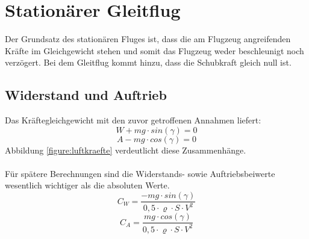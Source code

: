 \section{Stationärer Gleitflug}
Der Grundsatz des stationären Fluges ist, dass die am Flugzeug angreifenden Kräfte im Gleichgewicht stehen und somit das Flugzeug weder beschleunigt noch verzögert. Bei dem Gleitflug kommt hinzu, dass die Schubkraft gleich null ist.
\subsection{Widerstand und Auftrieb}
Das Kräftegleichgewicht mit den zuvor getroffenen Annahmen liefert:
\begin{equation}
\label{eq:kräftegleichgewichtWiderstand}
W + mg \cdot sin(\gamma) = 0
\end{equation}
%
%
%
\begin{equation}
\label{eq:kräftegleichgewichtAuftrieb}
A - mg \cdot cos(\gamma) = 0
\end{equation}
Abbildung \ref{figure:luftkraefte} verdeutlicht diese Zusammenhänge. \\  \\
Für spätere Berechnungen sind die Widerstands- sowie Auftriebsbeiwerte wesentlich wichtiger als die absoluten Werte.
\begin{equation}
C_W = \frac{-mg \cdot sin(\gamma)}{0,5  \cdot  \varrho  \cdot  S  \cdot  V^2}
\end{equation}
\begin{equation}
C_A = \frac{mg \cdot cos(\gamma)}{0,5  \cdot  \varrho  \cdot  S  \cdot  V^2}
\end{equation}
